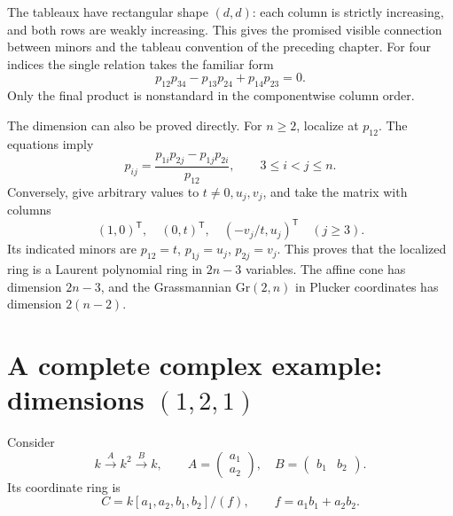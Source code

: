 The tableaux have rectangular shape \((d,d)\): each column
is strictly increasing, and both rows are weakly increasing.
This gives the promised visible connection between minors
and the tableau convention of the preceding chapter.
For four indices the single relation takes the familiar
form
\[
 p_{12}p_{34}-p_{13}p_{24}+p_{14}p_{23}=0.
\]
Only the final product is nonstandard in the componentwise
column order.

The dimension can also be proved directly.  For \(n\ge2\),
localize at \(p_{12}\).  The equations imply
\[
 p_{ij}
  =\frac{p_{1i}p_{2j}-p_{1j}p_{2i}}{p_{12}},
       \qquad 3\le i<j\le n.
\]
Conversely, give arbitrary values to \(t\ne0,u_j,v_j\),
and take the matrix with columns
\[
 (1,0)^{\mathsf T},\quad(0,t)^{\mathsf T},\quad
 (-v_j/t,u_j)^{\mathsf T}\quad(j\ge3).
\]
Its indicated minors are \(p_{12}=t\), \(p_{1j}=u_j\),
\(p_{2j}=v_j\).  This proves that the localized ring is
a Laurent polynomial ring in \(2n-3\) variables.
The affine cone has dimension \(2n-3\), and the
Grassmannian \(\mathrm{Gr}(2,n)\) in Plucker coordinates
has dimension \(2(n-2)\).

\section{A complete complex example: dimensions \((1,2,1)\)}

Consider
\[
 k\xrightarrow{A} k^2\xrightarrow{B}k,\qquad
 A=\begin{pmatrix}a_1\\a_2\end{pmatrix},\quad
 B=\begin{pmatrix}b_1&b_2\end{pmatrix}.
\]
Its coordinate ring is
\[
 C=k[a_1,a_2,b_1,b_2]/(f),\qquad
 f=a_1b_1+a_2b_2.
 \tag{Q}
\]

